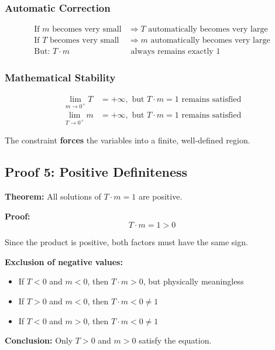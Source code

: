 	\subsubsection{Automatic Correction}
	\begin{align}
		\text{If } m \text{ becomes very small} &\Rightarrow T \text{ automatically becomes very large}\\
		\text{If } T \text{ becomes very small} &\Rightarrow m \text{ automatically becomes very large}\\
		\text{But: } T \cdot m &\text{ always remains exactly } 1
	\end{align}
	
	\subsubsection{Mathematical Stability}
	\begin{align}
		\lim_{m \to 0^+} T &= +\infty, \text{ but } T \cdot m = 1 \text{ remains satisfied}\\
		\lim_{T \to 0^+} m &= +\infty, \text{ but } T \cdot m = 1 \text{ remains satisfied}
	\end{align}
	
	The constraint \textbf{forces} the variables into a finite, well-defined region.
	
	\subsection{Proof 5: Positive Definiteness}
	
	\textbf{Theorem:} All solutions of $T \cdot m = 1$ are positive.
	
	\textbf{Proof:}
	\begin{equation}
		T \cdot m = 1 > 0
	\end{equation}
	
	Since the product is positive, both factors must have the same sign.
	
	\textbf{Exclusion of negative values:}
	\begin{itemize}
		\item If $T < 0$ and $m < 0$, then $T \cdot m > 0$, but physically meaningless
		\item If $T > 0$ and $m < 0$, then $T \cdot m < 0 \neq 1$
		\item If $T < 0$ and $m > 0$, then $T \cdot m < 0 \neq 1$
	\end{itemize}
	
	\textbf{Conclusion:} Only $T > 0$ and $m > 0$ satisfy the equation.
	
